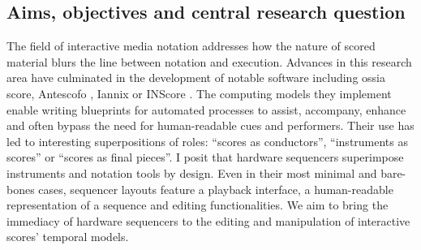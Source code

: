 \documentclass[journal,onecolumn]{IEEEtran}
\begin{document}
\subsection{Aims, objectives and central research question}
The field of interactive media notation addresses how the nature of scored material blurs the line between notation and execution. 
Advances in this research area have culminated in the development of notable software including ossia score\cite{jcelerier:thesis},  Antescofo \cite{ircam:antescofo}, Iannix \cite{buzzing:iannix} or INScore \cite{grame:inscore}.
The computing models they implement enable writing blueprints for automated processes to assist, accompany, enhance and often bypass the need for human-readable cues and performers. Their use has led to interesting superpositions of roles: ``scores as conductors'', ``instruments as scores'' or ``scores as final pieces''. I posit that hardware sequencers superimpose instruments and notation tools by design. Even in their most minimal and bare-bones cases, sequencer layouts feature a playback interface, a human-readable representation of a sequence and editing functionalities.
We aim to bring the immediacy of hardware sequencers to the editing and manipulation of interactive scores' temporal models.
\end{document}
